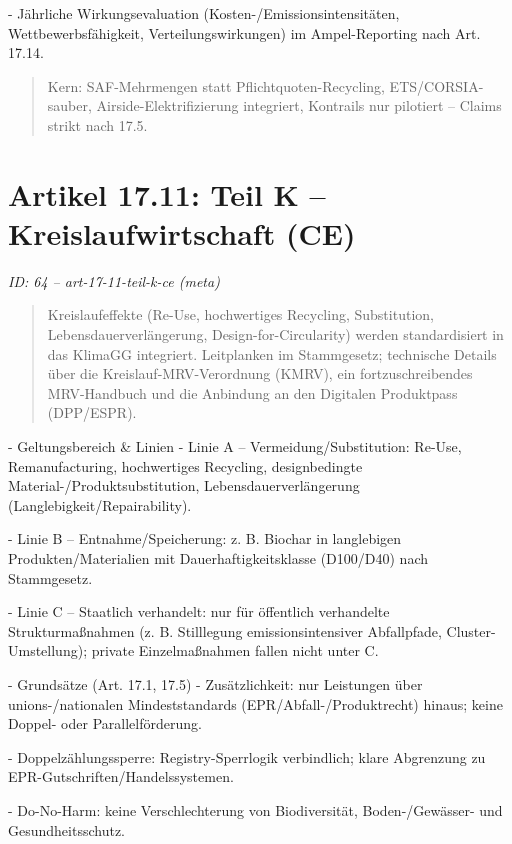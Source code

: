 \documentclass[12pt,a4paper]{scrartcl}
\begin{document}
- Jährliche Wirkungsevaluation (Kosten-/Emissionsintensitäten, Wettbewerbsfähigkeit, Verteilungswirkungen) im Ampel-Reporting nach Art. 17.14.

{\footnotesize\begin{quote}
Kern: SAF-Mehrmengen statt Pflichtquoten-Recycling, ETS/CORSIA-sauber, Airside-Elektrifizierung integriert, Kontrails nur pilotiert -- Claims strikt nach 17.5.
\end{quote}}



\section[Artikel 17.11: Teil K -- Kreislaufwirtschaft (CE)]{Artikel 17.11: Teil K -- Kreislaufwirtschaft (CE)}
\noindent\textit{ID: 64 -- art-17-11-teil-k-ce (meta)}

\begin{quote}
Kreislaufeffekte (Re-Use, hochwertiges Recycling, Substitution, Lebensdauerverlängerung, Design-for-Circularity) werden standardisiert in das KlimaGG integriert. Leitplanken im Stammgesetz; technische Details über die Kreislauf-MRV-Verordnung (KMRV), ein fortzuschreibendes MRV-Handbuch und die Anbindung an den Digitalen Produktpass (DPP/ESPR).
\end{quote}

- Geltungsbereich \& Linien
- Linie A -- Vermeidung/Substitution: Re-Use, Remanufacturing, hochwertiges Recycling, designbedingte Material-/Produktsubstitution, Lebensdauerverlängerung (Langlebigkeit/Repairability).

- Linie B -- Entnahme/Speicherung: z. B. Biochar in langlebigen Produkten/Materialien mit Dauerhaftigkeitsklasse (D100/D40) nach Stammgesetz.

- Linie C -- Staatlich verhandelt: nur für öffentlich verhandelte Strukturmaßnahmen (z. B. Stilllegung emissionsintensiver Abfallpfade, Cluster-Umstellung); private Einzelmaßnahmen fallen nicht unter C.

- Grundsätze (Art. 17.1, 17.5)
- Zusätzlichkeit: nur Leistungen über unions-/nationalen Mindeststandards (EPR/Abfall-/Produktrecht) hinaus; keine Doppel- oder Parallelförderung.

- Doppelzählungssperre: Registry-Sperrlogik verbindlich; klare Abgrenzung zu EPR-Gutschriften/Handelssystemen.

- Do-No-Harm: keine Verschlechterung von Biodiversität, Boden-/Gewässer- und Gesundheitsschutz.
\end{document}
